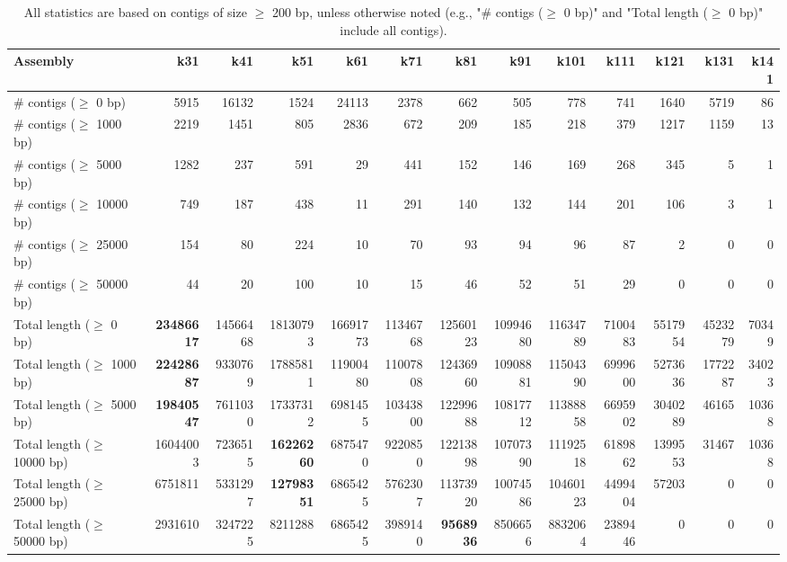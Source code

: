 \documentclass[12pt,a4paper]{article}
\begin{document}
\begin{table}[ht]
\begin{center}
\caption{All statistics are based on contigs of size $\geq$ 200 bp, unless otherwise noted (e.g., "\# contigs ($\geq$ 0 bp)" and "Total length ($\geq$ 0 bp)" include all contigs).}
\begin{tabular}{|l*{12}{|r}|}
\hline
Assembly & k31 & k41 & k51 & k61 & k71 & k81 & k91 & k101 & k111 & k121 & k131 & k141 \\ \hline
\# contigs ($\geq$ 0 bp) & 5915 & 16132 & 1524 & 24113 & 2378 & 662 & 505 & 778 & 741 & 1640 & 5719 & 86 \\ \hline
\# contigs ($\geq$ 1000 bp) & 2219 & 1451 & 805 & 2836 & 672 & 209 & 185 & 218 & 379 & 1217 & 1159 & 13 \\ \hline
\# contigs ($\geq$ 5000 bp) & 1282 & 237 & 591 & 29 & 441 & 152 & 146 & 169 & 268 & 345 & 5 & 1 \\ \hline
\# contigs ($\geq$ 10000 bp) & 749 & 187 & 438 & 11 & 291 & 140 & 132 & 144 & 201 & 106 & 3 & 1 \\ \hline
\# contigs ($\geq$ 25000 bp) & 154 & 80 & 224 & 10 & 70 & 93 & 94 & 96 & 87 & 2 & 0 & 0 \\ \hline
\# contigs ($\geq$ 50000 bp) & 44 & 20 & 100 & 10 & 15 & 46 & 52 & 51 & 29 & 0 & 0 & 0 \\ \hline
Total length ($\geq$ 0 bp) & {\bf 23486617} & 14566468 & 18130793 & 16691773 & 11346768 & 12560123 & 10994680 & 11634789 & 7100483 & 5517954 & 4523279 & 70349 \\ \hline
Total length ($\geq$ 1000 bp) & {\bf 22428687} & 9330769 & 17885811 & 11900480 & 11007808 & 12436960 & 10908881 & 11504390 & 6999600 & 5273636 & 1772287 & 34023 \\ \hline
Total length ($\geq$ 5000 bp) & {\bf 19840547} & 7611030 & 17337312 & 6981455 & 10343800 & 12299688 & 10817712 & 11388858 & 6695902 & 3040289 & 46165 & 10368 \\ \hline
Total length ($\geq$ 10000 bp) & 16044003 & 7236515 & {\bf 16226260} & 6875470 & 9220850 & 12213898 & 10707390 & 11192518 & 6189862 & 1399553 & 31467 & 10368 \\ \hline
Total length ($\geq$ 25000 bp) & 6751811 & 5331297 & {\bf 12798351} & 6865425 & 5762307 & 11373920 & 10074586 & 10460123 & 4499404 & 57203 & 0 & 0 \\ \hline
Total length ($\geq$ 50000 bp) & 2931610 & 3247225 & 8211288 & 6865425 & 3989140 & {\bf 9568936} & 8506656 & 8832064 & 2389446 & 0 & 0 & 0 \\ \hline

\end{tabular}
\end{center}
\end{table}
\end{document}
